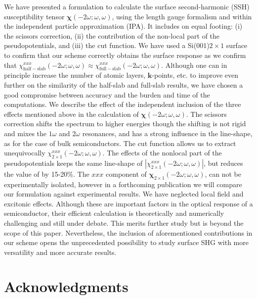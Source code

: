 \documentclass[floatfix,prb,aps,superscriptaddress,showpacs,11pt,preprint,letterpaper]{revtex4}
\begin{document}
We have presented a formulation to calculate the surface second-harmonic
(SSH) susceptibility tensor $\boldsymbol{\chi}(-2\omega;\omega,\omega)$, using the length gauge
formalism and within the independent particle approximation (IPA).
It includes on equal footing:
(i) the scissors correction, 
(ii) the  
contribution of the non-local part of the pseudopotentials, and  
(iii) the cut function.
We have used a Si(001)$2\times 1$ surface to confirm that our scheme
correctly obtains the surface response as we confirm
that 
$\chi_{\mathrm{half-slab}}^{xxx}(-2\omega;\omega,\omega) 
\approx
\chi_{\mathrm{full-slab}}^{xxx}(-2\omega;\omega,\omega) 
. 
$
Although one can in principle increase the number of atomic layers,
$\mathbf{k}$-points, etc. to
improve even further on the similarity of the half-slab and full-slab results, we
have chosen a good compromise between accuracy and the burden and time
of the computations. 
We describe the effect of the independent inclusion of the three
effects mentioned above in the calculation of  
$\boldsymbol{\chi}(-2\omega;\omega,\omega)$. 
The scissors correction shifts the spectrum to  
higher energies though the shifting is not rigid and mixes the 
$1\omega$ and $2\omega$ resonances,  
and has a strong influence in the line-shape,
as for the case of bulk semiconductors.\cite{luppiJCP10,luppiPRB10,leitsmannPRB05}
 The cut function allows us  
to extract unequivocally $\chi^{xxx}_{2\times 1}(-2\omega;\omega,\omega)$.
 The effects of the nonlocal part of the pseudopotentials  
keeps the same line-shape of $|\chi^{xxx}_{2\times
  1}(-2\omega;\omega,\omega)|$,
but  
reduces the value of   
by 15-20\%. 
The $xxx$ component of  
$\boldsymbol{\chi}_{2\times 1}(-2\omega;\omega,\omega)$, 
can not be
experimentally isolated,
however in a forthcoming publication 
we will compare our formulation 
against
experimental 
results. 
We have neglected
local field 
and excitonic effects.
Although these are important factors in the optical response of a semiconductor, 
their efficient calculation is theoretically and  
numerically challenging and still  
under debate.\cite{beyond}   
This merits further study but is beyond the scope of this paper. 
Nevertheless, the inclusion of aforementioned contributions 
in
our scheme opens the unprecedented possibility to study 
surface SHG with more versatility
and 
more accurate results.

\section{Acknowledgments}
\end{document}
